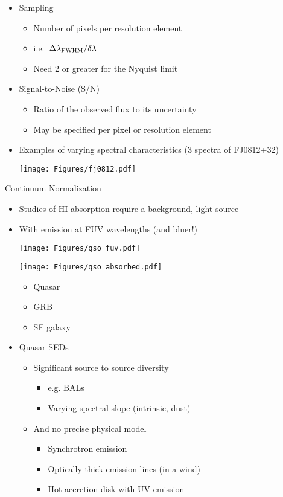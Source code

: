 \documentclass[12pt,letterpaper]{article}
\begin{document}
\begin{Aenumerate}
\begin{itemize}
  \item Sampling
  	\begin{itemize}
  	\item Number of pixels per resolution element
  	\item i.e.\  $\Delta\lambda_{\rm FWHM} / \delta\lambda$
  	\item Need 2 or greater for the Nyquist limit
  	\end{itemize}

  \item Signal-to-Noise (S/N)
  	\begin{itemize}
  	\item Ratio of the observed flux to its uncertainty
  	\item May be specified per pixel or resolution element
  	\end{itemize}
  \item Examples of varying spectral characteristics (3 spectra of FJ0812+32)

	\texttt{[image: Figures/fj0812.pdf]}

 \end{itemize}

{\bf \item Continuum Normalization}
 \begin{itemize}
 \item Studies of HI absorption require a background, light source
 \item With emission at FUV wavelengths (and bluer!)

	\texttt{[image: Figures/qso\_fuv.pdf]}

	\texttt{[image: Figures/qso\_absorbed.pdf]}

 	\begin{itemize}
 	\item Quasar
 	\item GRB
 	\item SF galaxy
 	\end{itemize}
 \item Quasar SEDs
 	\begin{itemize}
 	\item Significant source to source diversity
 		\begin{itemize}
 		\item e.g. BALs
	 	\item Varying spectral slope (intrinsic, dust)
 		\end{itemize}
 	\item And no precise physical model
 		\begin{itemize}
 		\item Synchrotron emission
 		\item Optically thick emission lines (in a wind)
 		\item Hot accretion disk with UV emission
 		\end{itemize}


\end{itemize}
\end{itemize}
\end{Aenumerate}
\end{document}
